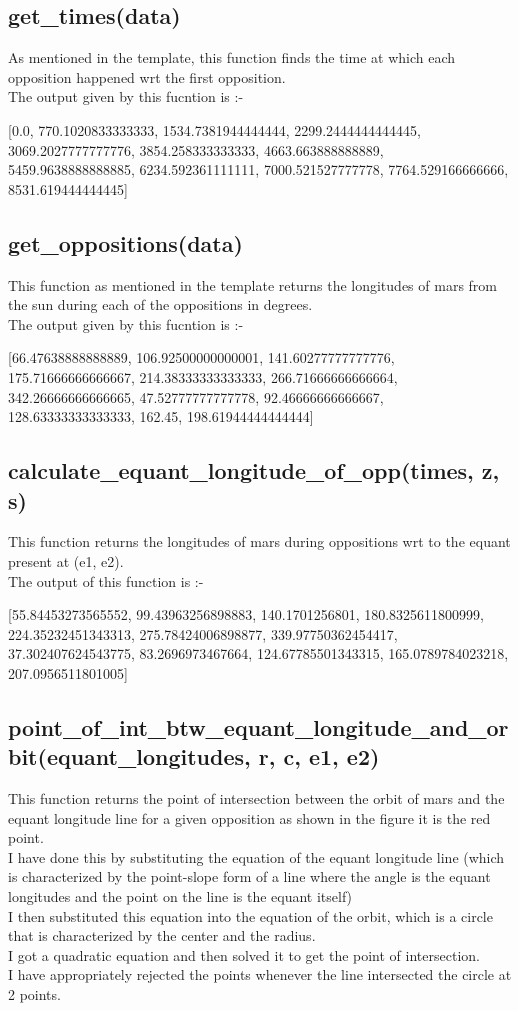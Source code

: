 \documentclass{article}
\begin{document}
\subsection{get\_times(data)}
As mentioned in the template, this function finds the time at which each opposition happened wrt the first opposition. \\The output given by this fucntion is :-

[0.0, 770.1020833333333, 1534.7381944444444, 2299.2444444444445, 3069.2027777777776, 3854.258333333333, 4663.663888888889, 5459.9638888888885, 6234.592361111111, 7000.521527777778, 7764.529166666666, 8531.619444444445]

\subsection{get\_oppositions(data)}
This function as mentioned in the template returns the longitudes of mars from the sun during each of the oppositions in degrees.\\ The output given by this fucntion is :-

[66.47638888888889, 106.92500000000001, 141.60277777777776, 175.71666666666667, 214.38333333333333, 266.71666666666664, 342.26666666666665, 47.52777777777778, 92.46666666666667, 128.63333333333333, 162.45, 198.61944444444444]

\subsection{calculate\_equant\_longitude\_of\_opp(times, z, s)}
This function returns the longitudes of mars during oppositions wrt to the equant present at (e1, e2).\\
The output of this function is :-

[55.84453273565552, 99.43963256898883, 140.1701256801, 180.8325611800999, 224.35232451343313, 275.78424006898877, 339.97750362454417, 37.302407624543775, 83.2696973467664, 124.67785501343315, 165.0789784023218, 207.0956511801005]
\newpage
\subsection{point\_of\_int\_btw\_equant\_longitude\_and\_orbit(equant\_longitudes, r, c, e1, e2)}
This function returns the point of intersection between the orbit of mars and the equant longitude line for a given opposition as shown in the figure it is the red point.\\
I have done this by substituting the equation of the equant longitude line (which is characterized by the point-slope form of a line where the angle is the equant longitudes and the point on the line is the equant itself)\\
I then substituted this equation into the equation of the orbit, which is a circle that is characterized by the center and the radius.\\
I got a quadratic equation and then solved it to get the point of intersection.\\
I have appropriately rejected the points whenever the line intersected the circle at 2 points.\\
\end{document}

